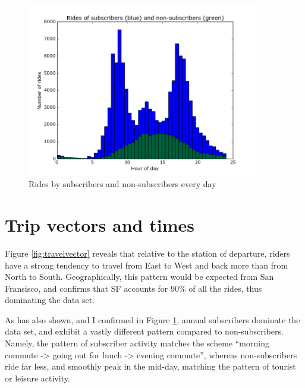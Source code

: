 \documentclass{article}
\begin{document}
\begin{figure}
	\centering
	\includegraphics[width=0.9\textwidth]{../time_of_day_sub_not_sub.png}
	\caption{Rides by subscribers and non-subscribers every day}
	\label{fig:sns}
\end{figure}

\section{Trip vectors and times}
Figure \ref{fig:travelvector} reveals that relative to the station of departure, riders have a strong tendency to travel from East to West and back more than from North to South. Geographically, this pattern would be expected from San Fransisco, and \cite{babs} confirms that SF accounts for 90\% of all the rides, thus dominating the data set.

As \cite{babs} has also shown, and I confirmed in Figure \ref{fig:sns}, annual subscribers dominate the data set, and exhibit a vastly different pattern compared to non-subscribers. Namely, the pattern of subscriber activity matches the scheme ``morning commute -> going out for lunch -> evening commute'', whereas non-subscribers ride far less, and smoothly peak in the mid-day, matching the pattern of tourist or leisure activity.
\end{document}
